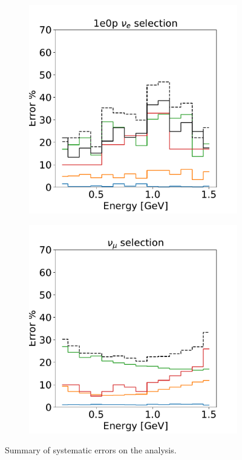 \begin{figure}[H]
\begin{center}
\begin{subfigure}[b]{0.32\textwidth}
    \includegraphics[width=1.00\textwidth]{Systematics/1e0p_syst_summary.pdf}
    \caption{\label{fig:systsummary:zp}\zpsel}
    \end{subfigure}
    \begin{subfigure}[b]{0.32\textwidth}
    \centering
    \includegraphics[width=1.00\textwidth]{Systematics/numu_syst_summary.pdf}
    \caption{\label{fig:systsummary:numu}\numu}
    \end{subfigure}
\caption{\label{fig:systsummary}Summary of systematic errors on the analysis.}
\end{center}
\end{figure}

